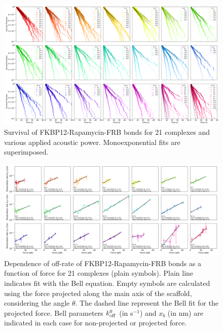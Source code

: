 \documentclass{biophys-new}
\begin{document}


\begin{figure}
	\centering
	\centerline {\includegraphics[width=1\linewidth]{Figures/multisurvival2Bis_Rapa.png}}
	\caption{Survival of FKBP12-Rapamycin-FRB bonds for 21 complexes and various applied acoustic power. Monoexponential fits are superimposed.}
	\label{fig:MultiSurvival}	
\end{figure}

\begin{figure}
	\centering
	\centerline {\includegraphics[width=1\linewidth]{Figures/offrate_vs_forceBis_Rapa.png}}
	\caption{Dependence of off-rate of FKBP12-Rapamycin-FRB bonds as a function of force for 21 complexes (plain symbols). Plain line indicates fit with the Bell equation. Empty symbols are calculated using the force projected along the main axis of the scaffold, considering the angle $\theta$. The dashed line represent the Bell fit for the projected force. Bell parameters $k^0_{\rm off}$ (in s$^{-1}$) and $x_b$ (in nm) are indicated in each case for non-projected or projected force. }
	\label{fig:offrate_force}	
\end{figure}
\end{document}
